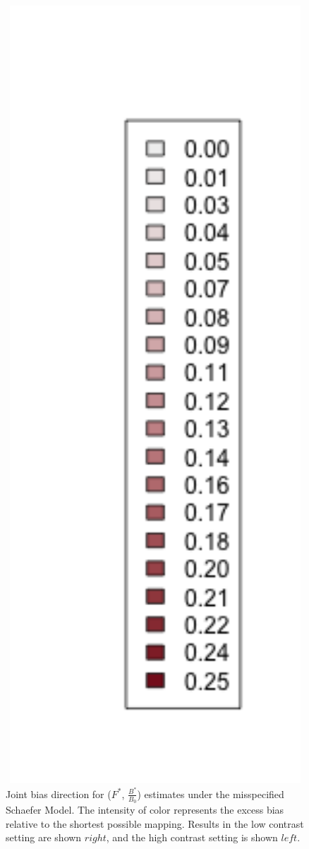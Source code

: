 \begin{figure}[h!]
\begin{minipage}[h!]{0.44\textwidth}
\end{minipage}
\begin{minipage}[h!]{0.09\textwidth}
\hspace{-1cm}
\includegraphics[width=1.5\textwidth]{../ptNew/subLegnd.png}
\end{minipage}
\caption{
Joint bias direction for ($F^*$, $\frac{B^*}{B_0}$) estimates under
the misspecified Schaefer Model. The intensity of color represents the excess
bias relative to the shortest possible mapping. Results in the low contrast setting
are shown $right$, and the high contrast setting is shown $left$.
}
\label{arrowsPT}
\end{figure}

